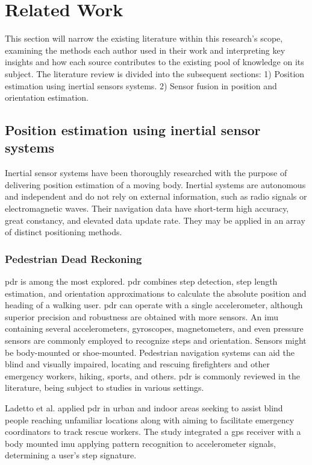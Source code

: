 \section{Related Work}
This section will narrow the existing literature within this research's scope, examining the methods each author used in their work and interpreting key insights and how each source contributes to the existing pool of knowledge on its subject. The literature review is divided into the subsequent sections: 1) Position estimation using inertial sensors systems. 2) Sensor fusion in position and orientation estimation.

\subsection{Position estimation using inertial sensor systems}

Inertial sensor systems have been thoroughly researched with the purpose of delivering position estimation of a moving body. Inertial systems are autonomous and independent and do not rely on external information, such as radio signals or electromagnetic waves. Their navigation data have short-term high accuracy, great constancy, and elevated data update rate. They may be applied in an array of distinct positioning methods.

\subsubsection{Pedestrian Dead Reckoning}

\acrfull{pdr} is among the most explored. \acrshort{pdr} combines step detection, step length estimation, and orientation approximations to calculate the absolute position and heading of a walking user. \acrshort{pdr} can operate with a single accelerometer, although superior precision and robustness are obtained with more sensors. An \acrshort{imu} containing several accelerometers, gyroscopes, magnetometers, and even pressure sensors are commonly employed to recognize steps and orientation. Sensors might be body-mounted or shoe-mounted. Pedestrian navigation systems can aid the blind and visually impaired, locating and rescuing firefighters and other emergency workers, hiking, sports, and others. \acrshort{pdr} is commonly reviewed in the literature, being subject to studies in various settings.

Ladetto et al. \cite{ladetto2002step} applied \acrshort{pdr} in urban and indoor areas seeking to assist blind people reaching unfamiliar locations along with aiming to facilitate emergency coordinators to track rescue workers. The study integrated a \acrshort{gps} receiver with a body mounted \acrshort{imu} applying pattern recognition to accelerometer signals, determining a user's step signature.

